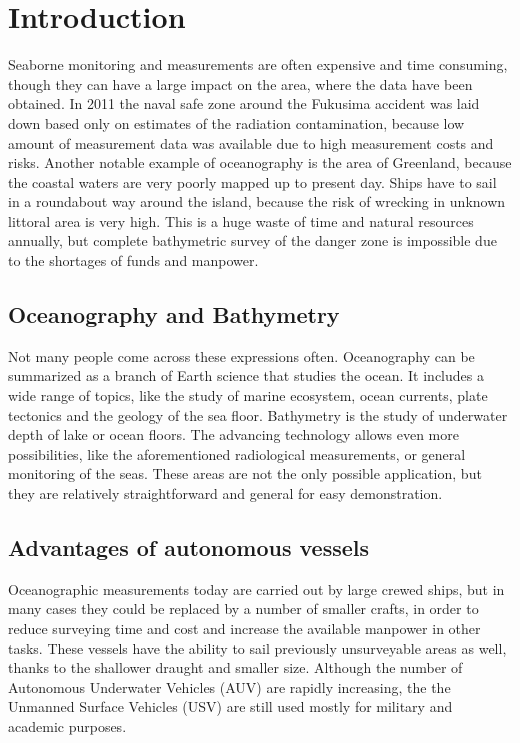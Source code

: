 \section{Introduction}

Seaborne monitoring and measurements are often expensive and time consuming, though they can have a large impact on the area, where the data have been obtained. In 2011 the naval safe zone around the Fukusima accident was laid down based only on estimates of the radiation contamination\cite{FNPP}, because low amount of measurement data was available due to high measurement costs and risks. Another notable example of oceanography is the area of Greenland, because the coastal waters are very poorly mapped up to present day\cite{2009AGUFMOS21A1152W}. Ships have to sail in a roundabout way around the island, because the risk of wrecking in unknown littoral area is very high. This is a huge waste of time and natural resources annually, but complete bathymetric survey of the danger zone is impossible due to the shortages of funds and manpower.

\subsection*{Oceanography and Bathymetry}

Not many people come across these expressions often. Oceanography can be summarized as a branch of Earth science that studies the ocean. It includes a wide range of topics, like the study of marine ecosystem, ocean currents, plate tectonics and the geology of the sea floor. Bathymetry is the study of underwater depth of lake or ocean floors. The advancing technology allows even more possibilities, like the aforementioned radiological measurements, or general monitoring of the seas. These areas are not the only possible application, but they are relatively straightforward and general for easy demonstration.

\subsection*{Advantages of autonomous vessels}

Oceanographic measurements today are carried out by large crewed ships, but in many cases they could be replaced by a number of smaller crafts, in order to reduce surveying time and cost and increase the available manpower in other tasks. These vessels have the ability to sail previously unsurveyable areas as well, thanks to the shallower draught and smaller size. Although the number of Autonomous Underwater Vehicles (AUV) are rapidly increasing\cite{AUV_growth}, the the Unmanned Surface Vehicles (USV) are still used mostly for military and academic purposes\cite{USV_applications}.

